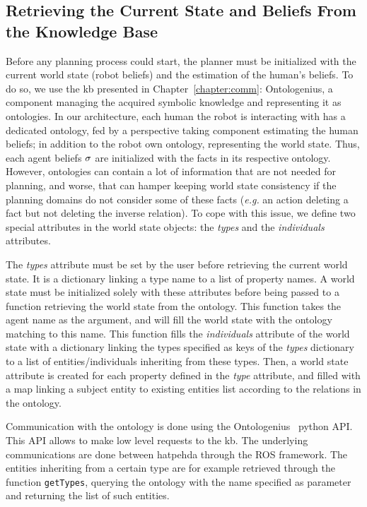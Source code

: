 \documentclass[a4paper,11pt,twoside]{StyleThese}
\begin{document}
\subsection{Retrieving the Current State and Beliefs From the Knowledge Base}
Before any planning process could start, the planner must be initialized with the current world state (robot beliefs) and the estimation of the human's beliefs. To do so, we use the \acrfull{kb} presented in Chapter~\ref{chapter:comm}: Ontologenius, a component managing the acquired symbolic knowledge and representing it as ontologies. In our architecture, each human the robot is interacting with has a dedicated ontology, fed by a perspective taking component estimating the human beliefs; in addition to the robot own ontology, representing the world state. Thus, each agent beliefs $\sigma$ are initialized with the facts in its respective ontology.
However, ontologies can contain a lot of information that are not needed for planning, and worse, that can hamper keeping world state consistency if the planning domains do not consider some of these facts (\textit{e.g.} an action deleting a fact but not deleting the inverse relation). To cope with this issue, we define two special attributes in the world state objects: the \textit{types} and the \textit{individuals} attributes.

The \textit{types} attribute must be set by the user before retrieving the current world state. It is a dictionary linking a type name to a list of property names. A world state must be initialized solely with these attributes before being passed to a function retrieving the world state from the ontology. This function takes the agent name as the argument, and will fill the world state with the ontology matching to this name. This function fills the \textit{individuals} attribute of the world state with a dictionary linking the types specified as keys of the  \textit{types} dictionary to a list of entities/individuals inheriting from these types. Then, a world state attribute is created for each property defined in the \textit{type} attribute, and filled with a map linking a subject entity to existing entities list according to the relations in the ontology. 

Communication with the ontology is done using the Ontologenius~\cite{sarthou2019ontologenius} python API. This API allows to make low level requests to the \acrshort{kb}. The underlying communications are done between \acrshort{hatpehda} through the ROS framework. The entities inheriting from a certain type are for example retrieved through the function \verb'getTypes', querying the ontology with the name specified as parameter and returning the list of such entities.
\end{document}
